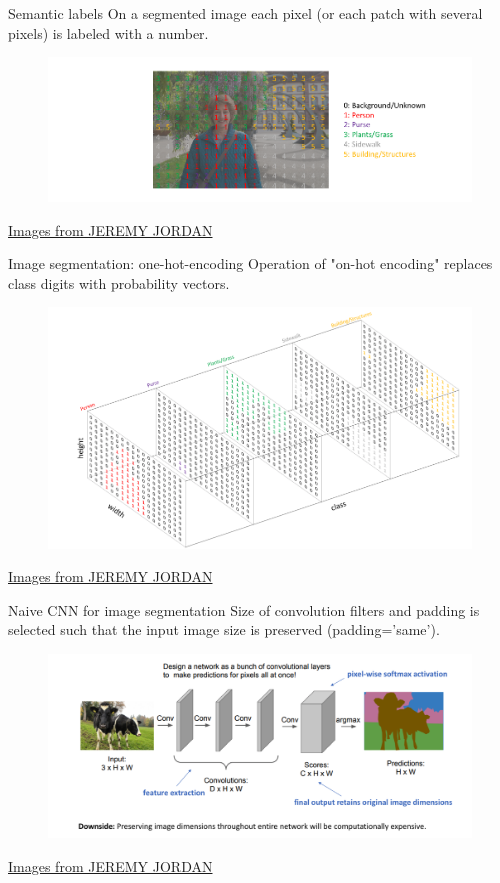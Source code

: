 \documentclass[handout]{beamer}
\begin{document}
\begin{frame}{Semantic labels}
    On a segmented image each pixel (or each patch with several pixels) is labeled with a number.
    \begin{figure}
   \centering
    \includegraphics[width=.8\textwidth]{fig/L2/Screen-Shot-2018-05-16-at-9.36.38-PM.png}
\end{figure}
{\tiny \href{https://www.jeremyjordan.me/semantic-segmentation/}{ Images from JEREMY JORDAN}}
\end{frame}

\begin{frame}{Image segmentation: one-hot-encoding}
    Operation of "on-hot encoding" replaces class digits with probability vectors.
    \begin{figure}
   \centering
    \includegraphics[width=.8\textwidth]{fig/L2/Screen-Shot-2018-05-16-at-9.36.00-PM.png}
\end{figure}
{\tiny \href{https://www.jeremyjordan.me/semantic-segmentation/}{ Images from JEREMY JORDAN}}
\end{frame}

\begin{frame}{Naive CNN for image segmentation}
    Size of convolution filters and padding is selected such that the input image size is preserved (padding='same').
    \begin{figure}
   \centering
    \includegraphics[width=.9\textwidth]{fig/L2/Screen-Shot-2018-05-19-at-12.32.20-PM.png}
\end{figure}
{\tiny \href{https://www.jeremyjordan.me/semantic-segmentation/}{ Images from JEREMY JORDAN}}
\end{frame}
\end{document}
